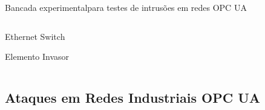 \documentclass{uspBeamer}
\begin{document}
\begin{frame}{Bancada experimental}{para testes de intrusões em redes OPC UA}
\begin{columns}
\begin{column}{.4\textwidth}
{\begin{wideitemize}
                        \item Ethernet Switch
                        \item Elemento Invasor
                    \end{wideitemize}
                }
            \end{column}
        \end{columns}
    \end{frame}

    \subsection{Ataques em Redes Industriais OPC UA}
\end{document}
